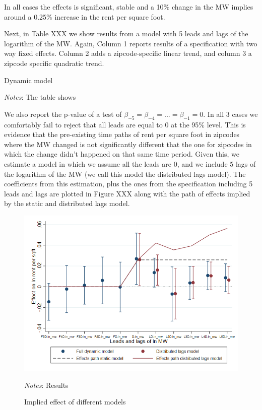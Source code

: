     
    In all cases the effects is significant, stable and a 10\% change in the MW implies around a 0.25\% increase in the rent per square foot. 
    
    Next, in Table XXX we show results from a model with 5 leads and lags of the logarithm of the MW. Again, Column 1 reports results of a specification with two way fixed effects. Column 2 adds a zipcode-specific linear trend, and column 3 a zipcode specific quadratic trend. 
    
    \begin{table}[h!] \centering
        \caption{Dynamic model}
        \label{tab:fd_table}
        \scalebox{0.85}{
        }
        \begin{minipage}{.95\textwidth} \footnotesize
			\vspace{3mm} 
			\textit{Notes}: The table shows
		\end{minipage}
    \end{table}
    
    We also report the p-value of a test of $\beta_{-5} = \beta_{-4} = ... = \beta_{-1} = 0$. In all 3 cases we comfortably fail to reject that all leads are equal to 0 at the 95\% level. This is evidence that the pre-existing time paths of rent per square foot in zipcodes where the MW changed is not significantly different that the one for zipcodes in which the change didn't happened on that same time period. Given this, we estimate a model in which we assume all the leads are 0, and we include 5 lags of the logarithm of the MW (we call this model the distributed lags model). The coefficients from this estimation, plus the ones from the specification including 5 leads and lags are plotted in Figure XXX along with the path of effects implied by the static and distributed lags model. 
    
    \begin{figure}[h!] \centering
        \caption{Implied effect of different models}
        \label{fig:fd_models}
        \includegraphics[width=0.75\linewidth]{analysis/first_differences/output/fd_models.png}
        \begin{minipage}{.95\textwidth} \footnotesize
			\vspace{2mm} 
			\textit{Notes}: Results 
		\end{minipage}
    \end{figure}
    

